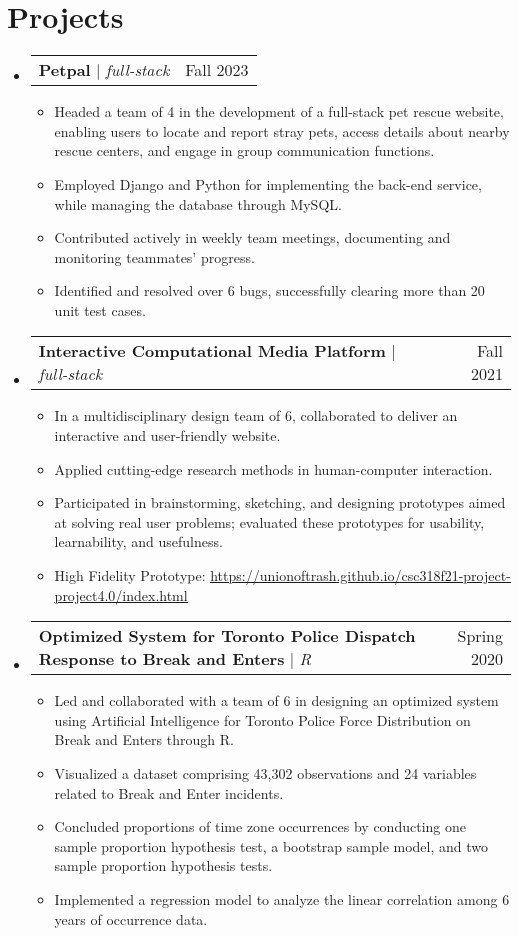 \documentclass[letterpaper,11pt]{article}
\makeatletter
\newcommand{\resumeItem}[1]{
  \item\small{
    {#1 \vspace{-2pt}}
  }
}
\newcommand{\resumeProjectHeading}[2]{
    \item
    \begin{tabular*}{0.97\textwidth}{l@{\extracolsep{\fill}}r}
      \small#1 & #2 \\
    \end{tabular*}\vspace{-7pt}
}
\newcommand{\resumeSubHeadingListStart}{\begin{itemize}[leftmargin=0.15in, label={}]}
\newcommand{\resumeSubHeadingListEnd}{\end{itemize}}
\newcommand{\resumeItemListStart}{\begin{itemize}}
\newcommand{\resumeItemListEnd}{\end{itemize}\vspace{-5pt}}
\makeatother
\begin{document}
\section{Projects}
    \resumeSubHeadingListStart
      \resumeProjectHeading
          {\textbf{Petpal } $|$ \emph{full-stack}}{Fall 2023}
          \resumeItemListStart
            \resumeItem{Headed a team of 4 in the development of a full-stack pet rescue website, enabling users to locate and report stray pets, access details about nearby rescue centers, and engage in group communication functions.}
            \resumeItem{Employed Django and Python for implementing the back-end service, while managing the database through MySQL.}
            \resumeItem{Contributed actively in weekly team meetings, documenting and monitoring teammates’ progress.}
            \resumeItem{Identified and resolved over 6 bugs, successfully clearing more than 20 unit test cases.}
          \resumeItemListEnd
      \resumeProjectHeading
          {\textbf{Interactive Computational Media Platform } $|$ \emph{full-stack	}}{Fall 2021}
          \resumeItemListStart
            \resumeItem{In a multidisciplinary design team of 6, collaborated to deliver an interactive and user-friendly website.}
            \resumeItem{Applied cutting-edge research methods in human-computer interaction.}
            \resumeItem{Participated in brainstorming, sketching, and designing prototypes aimed at solving real user problems; evaluated these prototypes for usability, learnability, and usefulness.}
            \resumeItem{High Fidelity Prototype: \href{https://unionoftrash.github.io/csc318f21-project-project4.0/index.html}{\underline{https://unionoftrash.github.io/csc318f21-project-project4.0/index.html}}}
          \resumeItemListEnd
        \resumeProjectHeading
          {\textbf{Optimized System for Toronto Police Dispatch Response to Break and Enters} $|$ \emph{R}}{Spring 2020}
          \resumeItemListStart
            \resumeItem{Led and collaborated with a team of 6 in designing an optimized system using Artificial Intelligence for Toronto Police Force Distribution on Break and Enters through R.}
            \resumeItem{Visualized a dataset comprising 43,302 observations and 24 variables related to Break and Enter incidents.}
            \resumeItem{Concluded proportions of time zone occurrences by conducting one sample proportion hypothesis test, a bootstrap sample model, and two sample proportion hypothesis tests.}
            \resumeItem{Implemented a regression model to analyze the linear correlation among 6 years of occurrence data.}
          \resumeItemListEnd
    \resumeSubHeadingListEnd
\end{document}
